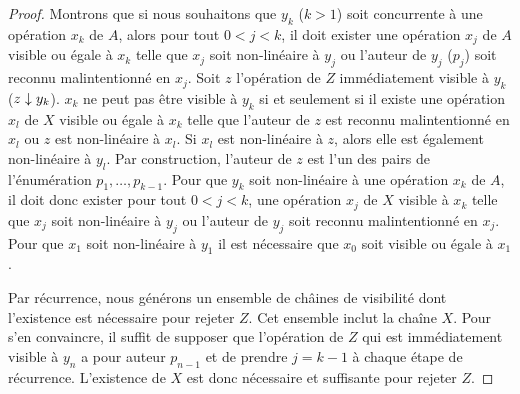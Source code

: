 \begin{proof}
Montrons que si nous souhaitons que $y_k$ ($k > 1$) soit concurrente à une opération $x_k$ de $A$, alors pour tout $0 < j < k$, il doit exister une opération $x_j$ de $A$ visible ou égale à $x_k$ telle que $x_j$ soit non-linéaire à $y_j$ ou l'auteur de $y_j$ ($p_j$) soit reconnu malintentionné en $x_j$.
Soit $z$ l'opération de $Z$ immédiatement visible à $y_k$ ($z \downarrow y_k$).
$x_k$ ne peut pas être visible à $y_k$ si et seulement si il existe une opération $x_l$ de $X$ visible ou égale à $x_k$ telle que l'auteur de $z$ est reconnu malintentionné en $x_l$ ou $z$ est non-linéaire à $x_l$.
Si $x_l$ est non-linéaire à $z$, alors elle est également non-linéaire à $y_l$.
Par construction, l'auteur de $z$ est l'un des pairs de l'énumération $p_1, \dotsc, p_{k-1}$.
Pour que $y_k$ soit non-linéaire à une opération $x_k$ de $A$, il doit donc exister pour tout $0 < j < k$, une opération $x_j$ de $X$ visible à $x_k$ telle que $x_j$ soit non-linéaire à $y_j$ ou l'auteur de $y_j$ soit reconnu malintentionné en $x_j$.
Pour que $x_1$ soit non-linéaire à $y_1$ il est nécessaire que $x_0$ soit visible ou égale à $x_1$.

Par récurrence, nous générons un ensemble de châines de visibilité dont l'existence est nécessaire pour rejeter $Z$.
Cet ensemble inclut la chaîne $X$.
Pour s'en convaincre, il suffit de supposer que l'opération de $Z$ qui est immédiatement visible à $y_n$ a pour auteur $p_{n-1}$ et de prendre $j = k-1$ à chaque étape de récurrence.
L'existence de $X$ est donc nécessaire et suffisante pour rejeter $Z$.
\end{proof}

